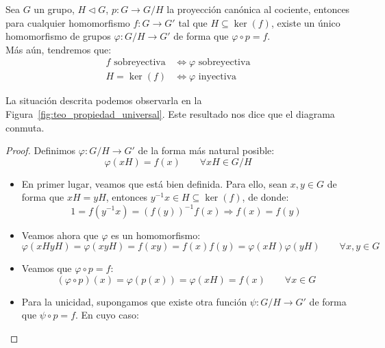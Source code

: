 \begin{teo}\label{teo:prop_universal}
    Sea $G$ un grupo, $H\lhd G$, $p:G\to G/H$ la proyección canónica al cociente, entonces para cualquier homomorfismo $f:G\to G'$ tal que $H\subseteq \ker(f)$, existe un único homomorfismo de grupos $\varphi:G/H\to G'$ de forma que $\varphi\circ p = f$.\\

    \noindent
    Más aún, tendremos que:
    \begin{align*}
        f \text{\ sobreyectiva} &\Longleftrightarrow \varphi \text{\ sobreyectiva}\\
        H = \ker(f) &\Longleftrightarrow \varphi \text{\ inyectiva}
    \end{align*}

    \noindent
    La situación descrita podemos observarla en la Figura~\ref{fig:teo_propiedad_universal}. Este resultado nos dice que el diagrama conmuta.
    \begin{proof}
        Definimos $\varphi:G/H\to G'$ de la forma más natural posible:
        \begin{equation*}
            \varphi(xH) = f(x) \qquad \forall xH \in G/H
        \end{equation*}
        \begin{itemize}
            \item En primer lugar, veamos que está bien definida. Para ello, sean $x,y\in G$ de forma que $xH = yH$, entonces $y^{-1}x\in H\subseteq \ker(f)$, de donde:
                \begin{equation*}
                    1 = f(y^{-1}x) = {(f(y))}^{-1}f(x) \Longrightarrow f(x) = f(y)
                \end{equation*}
            \item Veamos ahora que $\varphi$ es un homomorfismo:
                \begin{equation*}
                    \varphi(xHyH) = \varphi(xyH) = f(xy) = f(x) f(y) = \varphi(xH)\varphi(yH) \qquad \forall x,y\in G
                \end{equation*}
            \item Veamos que $\varphi\circ p = f$:
                \begin{equation*}
                    (\varphi \circ p)(x) = \varphi(p(x)) = \varphi(xH) = f(x) \qquad \forall x\in G
                \end{equation*}
            \item Para la unicidad, supongamos que existe otra función $\psi:G/H\to G'$ de forma que $\psi\circ p = f$. En cuyo caso:

\end{itemize}
\end{proof}
\end{teo}
